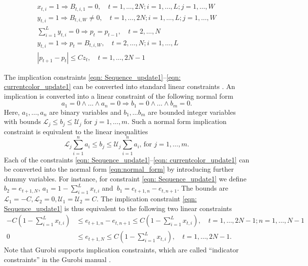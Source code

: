 \documentclass[11pt]{elsarticle}
\begin{document}
\begin{gather}
\label{eqn: Buffer_Update_y} \\
 x_{t,i}=1 \Rightarrow B_{t,i,1}=0, \quad t=1,\dots, 2N; i=1,\dots, L; j=1,\dots,W  \label{eqn: valid_store}  \\
 y_{t,i}=1 \Rightarrow B_{t,i,W}\neq 0, \quad t=1,\dots, 2N; i=1,\dots, L; j=1,\dots, W  \label{eqn: valid_retrieve}\\
%
%
\sum_{i=1}^L y_{t,i} =0 \Rightarrow p_{t}=p_{t-1}, \quad t=2, \dots, N\label{eqn: currentcolor_update0} \\
y_{t,i} =1 \Rightarrow p_{t}=B_{t,i,W}, \quad t=2, \dots, N; i=1,\dots, L \label{eqn: currentcolor_update1}\\
 |p_{t+1}-p_t|\leq C z_t, \quad t=1, \dots, 2N-1 \label{eqn: Definition_colorchange}
\end{gather}



 

The implication constraints \eqref{eqn: Sequence_update1}--\eqref{eqn: currentcolor_update1} can be converted into standard linear constraints \citep[see e.g.,][]{Plastria2002formulating}. 
An implication is converted into a linear constraint of the following normal form 
\begin{equation}
a_1=0\wedge\dots\wedge a_n=0\Rightarrow b_1=0\wedge\dots\wedge b_m=0.\label{eqn:normal_form}
\end{equation}
Here, $a_1,\dots,a_n$ are binary variables and $b_1,\dots b_m$ are bounded integer variables with bounds $\mathcal{L}_j \leq b_j \leq \mathcal{U}_j$ for $j=1,\dots,m$. Such a normal form implication constraint is equivalent to the linear inequalities 
\begin{equation}
\mathcal{L}_j\sum_{i=1}^n a_i \leq b_j \leq \mathcal{U}_j\sum_{i=1}^n a_i \text{, for } j=1,\dots,m.
\end{equation}
Each of the constraints \eqref{eqn: Sequence_update1}--\eqref{eqn: currentcolor_update1} can be converted into the normal form \eqref{eqn:normal_form} by introducing further dummy variables. For instance, for constraint \eqref{eqn: Sequence_update1} we define $b_2 = e_{t+1,N}$, $a_1=1-\sum_{i=1}^L x_{t,i}$ and $\ b_1=e_{t+1,n}-e_{t,n+1}$.
The bounds are $\mathcal{L}_1=-C, \mathcal{L}_2=0,\mathcal{U}_1=\mathcal{U}_2=C$. The implication constraint \eqref{eqn: Sequence_update1} is thus equivalent to the following two linear constraints
\begin{align}
-C(1-\sum_{i=1}^L x_{t,i}) & \leq e_{t+1,n}-e_{t,n+1} \leq C(1-\sum_{i=1}^Lx_{t,i}) ,\quad t=1, \dots, 2N-1; n=1, \dots, N-1 \\
0& \leq e_{t+1,N} \leq C(1-\sum_{i=1}^Lx_{t,i}) , \quad t=1, \dots, 2N-1.
\end{align}
Note that Gurobi supports implication constraints, which are called ``indicator constraints'' in the Gurobi manual \citep[p.~515]{gurobi}.
\end{document}
